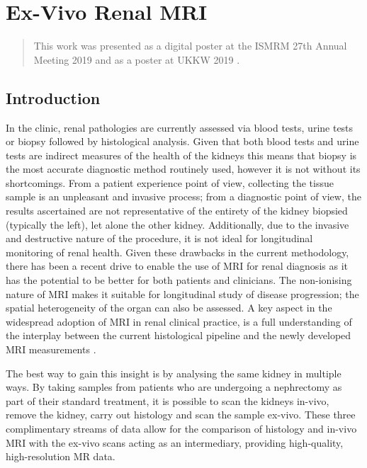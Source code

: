 \chapter{Ex-Vivo Renal MRI}
\label{chap:Neph}

\begin{abstract}
	This work was presented as a digital poster at the \ac{ISMRM} 27th Annual Meeting 2019 \cite{daniel_effects_2019} and as a poster at \ac{UKKW} 2019 \cite{kazmi_determining_2019}.
	
	\lipsum[1]
\end{abstract}
\newpage

\section{Introduction}

In the clinic, renal pathologies are currently assessed via blood tests, urine tests or biopsy followed by histological analysis. Given that both blood tests and urine tests are indirect measures of the health of the kidneys this means that biopsy is the most accurate diagnostic method routinely used, however it is not without its shortcomings. From a patient experience point of view, collecting the tissue sample is an unpleasant and invasive process; from a diagnostic point of view, the results ascertained are not representative of the entirety of the kidney biopsied (typically the left), let alone the other kidney. Additionally, due to the invasive and destructive nature of the procedure, it is not ideal for longitudinal monitoring of renal health. Given these drawbacks in the current methodology, there has been a recent drive to enable the use of \ac{MRI} for renal diagnosis as it has the potential to be better for both patients and clinicians. The non-ionising nature of \ac{MRI} makes it suitable for longitudinal study of disease progression; the spatial heterogeneity of the organ can also be assessed. A key aspect in the widespread adoption of \ac{MRI} in renal clinical practice, is a full understanding of the interplay between the current histological pipeline and the newly developed \ac{MRI} measurements \cite{simms_recent_2020}.

The best way to gain this insight is by analysing the same kidney in multiple ways. By taking samples from patients who are undergoing a nephrectomy as part of their standard treatment, it is possible to scan the kidneys in-vivo, remove the kidney, carry out histology and scan the sample ex-vivo. These three complimentary streams of data allow for the comparison of histology and in-vivo \ac{MRI} with the ex-vivo scans acting as an intermediary, providing high-quality, high-resolution MR data.

